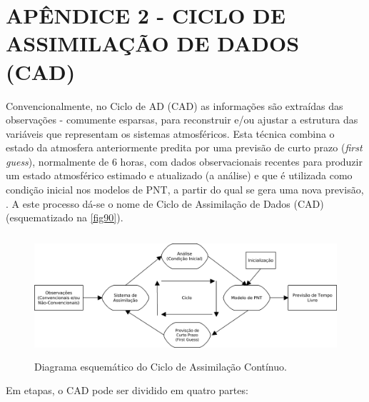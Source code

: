 \hypertarget{estilo:apendice2}{}

\chapter{APÊNDICE 2 - CICLO DE ASSIMILAÇÃO DE DADOS (CAD)}
\label{apendice2}

Convencionalmente, no Ciclo de AD (CAD) as informações são extraídas das observações - comumente esparsas, para reconstruir e/ou ajustar a estrutura das variáveis que representam os sistemas atmosféricos. Esta técnica combina o estado da atmosfera anteriormente predita por uma previsão de curto prazo (\textit{first guess}), normalmente de 6 horas, com dados observacionais recentes para produzir um estado atmosférico estimado e atualizado (a análise) e que é utilizada como condição inicial nos modelos de PNT, a partir do qual se gera uma nova previsão, \cite{kalnay03}. A este processo dá-se o nome de Ciclo de Assimilação de Dados (CAD) (esquematizado na \autoref{fig90}).

\begin{figure}[!hbp]
\centering
\includegraphics[height=4.5cm]{./figs/ciclo_ad.png}
\caption{Diagrama esquemático do Ciclo de Assimilação Contínuo.}
\label{fig90}
\end{figure}

Em etapas, o CAD pode ser dividido em quatro partes:

